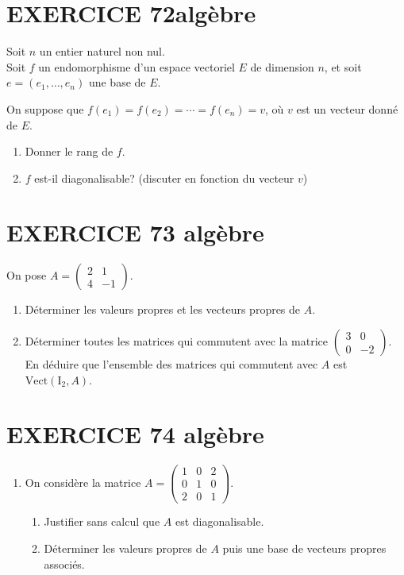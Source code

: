 \documentclass[10pt,oneside]{article}
\begin{document}
\begin{flushleft}
\begin{enumerate}
\end{enumerate}


\section*{EXERCICE 72\:algèbre }
Soit $n$ un entier naturel non nul.\\
Soit $f$ un endomorphisme d'un espace vectoriel $E$ de dimension $n$, et soit $e=\left( e_1,\ldots,e_n\right) $ une base de $E$.

On suppose que  $f(e_1)=f(e_2)=\cdots=f(e_n)=v$, où $v$ est un vecteur donné de $E$.
\begin{enumerate}
\item 
Donner le rang de $f$.

\item 
$f$ est-il diagonalisable? (discuter en fonction du vecteur $v$)
\end{enumerate}
		



\section*{EXERCICE 73 \: algèbre}

On pose $A=\begin{pmatrix}
2 & 1 \\ 
4 & -1
\end{pmatrix}$.

\begin{enumerate}

\item  Déterminer les valeurs propres et les vecteurs propres de $A$.
\item Déterminer toutes les matrices qui commutent avec la matrice $\begin{pmatrix}
3 & 0 \\ 
0 & -2
\end{pmatrix}$.\\
En déduire que l'ensemble des matrices qui commutent avec $A$ est $\mathrm{Vect}\left( \mathrm{I}_2,A\right) $.
\end{enumerate}

  \section*{EXERCICE 74 \: algèbre }



\begin{enumerate}
\item On considère la matrice $A=\begin{pmatrix}
1 & 0 & 2 \\ 
0 & 1 & 0\\ 
2 & 0 & 1
\end{pmatrix} $.
	\begin{enumerate}
	\item Justifier sans calcul que $A$ est diagonalisable.
	\item Déterminer les valeurs propres de $A$ puis une base de vecteurs propres associés.
	

\end{enumerate}
\end{enumerate}
\end{flushleft}
\end{document}
